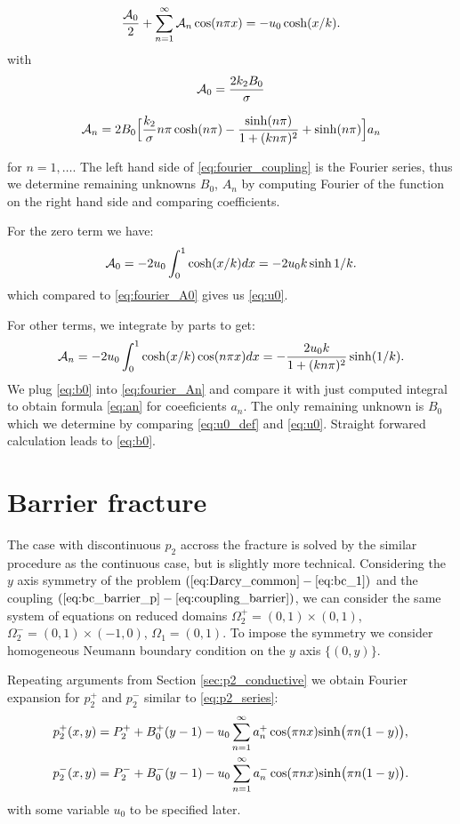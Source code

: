 \documentclass[a4paper,10pt]{article}
\begin{document}
\begin{equation}
    \label{eq:fourier_coupling}
    \frac{{\cal A}_0}{2} + \sum^{\infty}_{n=1} {\cal A}_n \cos (n\pi x) =  - u_0 \cosh(x/k).
\end{equation}
with
\begin{equation}
    \label{eq:fourier_A0}
    {\cal A}_0 = \frac{2 k_2 B_0}{\sigma} 
\end{equation}


\begin{equation}
    \label{eq:fourier_An} 
        {\cal A}_n = 2B_0 \Bigl[ \frac{k_2}{\sigma} n\pi \cosh(n\pi) - \frac{\sinh(n \pi)}{1 + (k n \pi)^2}  
    + \sinh(n \pi) \Bigr]a_n
\end{equation}

for $n=1, \dots$. The left hand side of \eqref{eq:fourier_coupling} is the Fourier series, thus we determine
remaining unknowns $B_0$, $A_n$ by computing Fourier of the function on the right hand side and comparing coefficients.

For the zero term we have:
\[
{\cal A}_0 = -2 u_0 \int _0^1 \cosh(x/k) dx =
- 2 u_0 k\sinh 1/k.
\]
which compared to \eqref{eq:fourier_A0} gives us \eqref{eq:u0}.


For other terms, we integrate by parts to get:
\[
{\cal A}_n = -2 u_0\int _0^1 \cosh(x/k) \cos (n\pi x) dx 
= -\frac{2u_0 k}{1+(k n \pi)^2}\sinh(1/k).
\]
We plug \eqref{eq:b0} into \eqref{eq:fourier_An} and compare it with just computed integral to obtain
formula \eqref{eq:an} for coeeficients $a_n$.
The only remaining unknown is $B_0$ which we determine by comparing \eqref{eq:u0_def} and \eqref{eq:u0}.
Straight forwared calculation leads to \eqref{eq:b0}.


\section{Barrier fracture}
\label{sec:barrier_frac}
The case with discontinuous $p_2$ accross the fracture is solved by the similar procedure as the continuous case, 
but is slightly more technical. Considering the $y$ axis symmetry of the problem $(\ref{eq:Darcy_common} - \ref{eq:bc_1})$ and 
the coupling $(\ref{eq:bc_barrier_p} - \ref{eq:coupling_barrier})$, we can consider the same system of equations 
on reduced domains $\Omega_2^+ = (0,1)\times (0,1)$, $\Omega_2^- = (0,1)\times(-1,0)$,
$\Omega_1 = (0,1)$. To impose the symmetry we consider homogeneous Neumann boundary condition on the $y$ axis $\{(0,y)\}$.

Repeating arguments from Section \ref{sec:p2_conductive} we obtain Fourier expansion for $p_2^+$ and $p_2^-$ similar to \eqref{eq:p2_series}:
\begin{align}
    \label{eq:p2_barrier_p}
    p_2^+(x,y) &= P_2^+ + B_0^+(y-1) - u_0\sum_{n=1}^\infty a_n^+ \cos(\pi n x) {\rm sinh} \big(\pi n(1-y)\big),\\ 
    \label{eq:p2_barrier_m}
    p_2^-(x,y) &= P_2^- + B_0^-(y-1) - u_0\sum_{n=1}^\infty a_n^- \cos(\pi n x) {\rm sinh} \big(\pi n(1-y)\big).
\end{align}
with some variable $u_0$ to be specified later.
\end{document}
